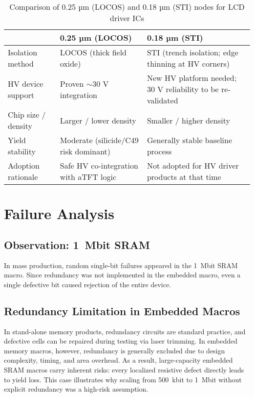 \documentclass[conference]{IEEEtran}
\begin{document}
\begin{table*}[!t]
\centering
\caption{Comparison of 0.25 µm (LOCOS) and 0.18 µm (STI) nodes for LCD driver ICs}
\label{tab:node_comparison}
\begin{tabular}{@{}lll@{}}
\toprule
 & \textbf{0.25 µm (LOCOS)} & \textbf{0.18 µm (STI)} \\
\midrule
Isolation method & LOCOS (thick field oxide) & STI (trench isolation; edge thinning at HV corners) \\
HV device support & Proven $\sim$30 V integration & New HV platform needed; 30 V reliability to be re-validated \\
Chip size / density & Larger / lower density & Smaller / higher density \\
Yield stability & Moderate (silicide/C49 risk dominant) & Generally stable baseline process \\
Adoption rationale & Safe HV co-integration with aTFT logic & Not adopted for HV driver products at that time \\
\bottomrule
\end{tabular}
\end{table*}

\section{Failure Analysis}
\subsection{Observation: 1~Mbit SRAM}
In mass production, random single-bit failures appeared in the 1~Mbit SRAM macro. Since redundancy was not implemented in the embedded macro, even a single defective bit caused rejection of the entire device.

\subsection{Redundancy Limitation in Embedded Macros}
In stand-alone memory products, redundancy circuits are standard practice, and defective cells can be repaired during testing via laser trimming.  
In embedded memory macros, however, redundancy is generally excluded due to design complexity, timing, and area overhead.  
As a result, large-capacity embedded SRAM macros carry inherent risks: every localized resistive defect directly leads to yield loss.  
This case illustrates why scaling from 500~kbit to 1~Mbit without explicit redundancy was a high-risk assumption.
\end{document}
